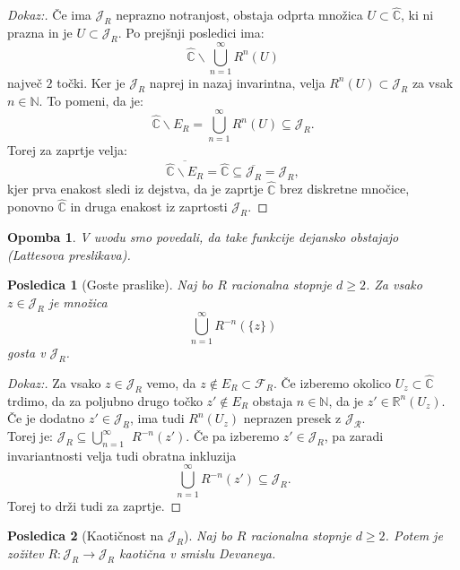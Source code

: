 \documentclass{article}
\newtheorem{posledica}{Posledica}
\newtheorem{opomba}{Opomba}
\newcommand{\C}{\mathbb{C}}
\newcommand{\N}{\mathbb{N}}
\newcommand{\R}{\mathbb{R}}
\begin{document}
\begin{proof}[Dokaz:]
Če ima $\mathcal{J}_R$ neprazno notranjost, obstaja odprta množica 
$U \subset \hat{\C}$, ki ni prazna in je $U \subset\mathcal{J}_R$. 
Po prejšnji posledici ima:
$$
\hat{\C} \backslash \bigcup_{n=1}^\infty R^n(U)
$$
največ $2$ točki. Ker je $\mathcal{J}_R$ naprej in nazaj invarintna, 
velja $R^n(U) \subset \mathcal{J}_R$ za vsak $n\in \N$. To pomeni, da je:
$$
\hat{\C} \backslash E_R = \bigcup_{n=1}^\infty R^n(U) \subseteq \mathcal{J}_R. 
$$
Torej za zaprtje velja:
$$
\overline{\hat{\C} \backslash E_R} = \hat{\C} \subseteq \overline{\mathcal{J}_R} = \mathcal{J}_R,
$$
kjer prva enakost sledi iz dejstva, da je zaprtje $\hat{\C}$ brez diskretne mnočice, 
ponovno $\hat{\C}$ in druga enakost iz zaprtosti $\mathcal{J}_R$.
\end{proof}

\begin{opomba}
V uvodu smo povedali, da take funkcije dejansko obstajajo (Lattesova preslikava).
\end{opomba}


\begin{posledica}[Goste praslike]
\label{pos:3}
Naj bo $R$ racionalna stopnje $d \geq 2$. Za vsako $z\in \mathcal{J}_R$
je množica 
$$\bigcup_{n=1}^\infty R^{-n}(\{z\})$$
gosta v $\mathcal{J}_R$.
\end{posledica}

\begin{proof}[Dokaz:]
Za vsako $z \in \mathcal{J}_R$ vemo, da $z\not\in E_R \subset \mathcal{F}_R$.
Če izberemo okolico $U_z \subset \hat{\C}$ trdimo, da za poljubno 
drugo točko $z' \not\in E_R$ obstaja $n\in \N$, da je $z' \in \R^n(U_z)$.\\
Če je dodatno $z' \in \mathcal{J}_R$, ima tudi $R^n(U_z)$ neprazen presek z 
$\mathcal{J_R}$.\\
Torej je: $\mathcal{J}_R \subseteq \overline{\bigcup_{n=1}^\infty} R^{-n}(z')$.
Če pa izberemo $z' \in \mathcal{J}_R$, pa zaradi invariantnosti velja 
tudi obratna inkluzija
$$
\bigcup_{n=1}^\infty R^{-n}(z') \subseteq \mathcal{J}_R.
$$
Torej to drži tudi za zaprtje.
\end{proof}

\begin{posledica}[Kaotičnost na $\mathcal{J}_R$]
Naj bo $R$ racionalna stopnje $d \geq 2$. Potem je zožitev 
$R: \mathcal{J}_R \rightarrow \mathcal{J}_R$ kaotična v smislu 
Devaneya.
\end{posledica}
\end{document}
